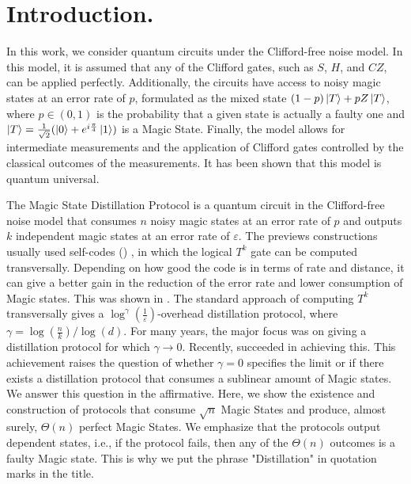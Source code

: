 \section{Introduction.}  
In this work, we consider quantum circuits under the Clifford-free noise model. In this model, it is assumed that any of the Clifford gates, such as $S$, $H$, and $CZ$, can be applied perfectly. Additionally, the circuits have access to noisy magic states at an error rate of $p$, formulated as the mixed state $(1-p)\ket{T} + pZ\ket{T}$, where $p \in (0,1)$ is the probability that a given state is actually a faulty one and $\ket{T}= \frac{1}{\sqrt{2}}(\ket{0} + e^{i\frac{\pi}{4}}\ket{1})$ is a Magic State. Finally, the model allows for intermediate measurements and the application of Clifford gates controlled by the classical outcomes of the measurements. It has been shown that this model is quantum universal.

The Magic State Distillation Protocol is a quantum circuit in the Clifford-free noise model that consumes $n$ noisy magic states at an error rate of $p$ and outputs $k$ independent magic states at an error rate of $\varepsilon$. The previews constructions usually used self-\trig codes () \cite{bravyi2012magic}, in which the logical $T^{k}$ gate can be computed transversally. Depending on how good the code is in terms of rate and distance, it can give a better gain in the reduction of the error rate and lower consumption of Magic states. This was shown in . The standard approach of computing $T^{k}$ transversally gives a $\log^{\gamma}(\frac{1}{\varepsilon})$-overhead distillation protocol, where $\gamma = \log(\frac{n}{k}) / \log(d)$. 
For many years, the major focus was on giving a distillation protocol for which $\gamma \rightarrow 0$. Recently, \cite{constantoverheadmagicstatedistillation} succeeded in achieving this. This achievement raises the question of whether $\gamma = 0$ specifies the limit or if there exists a distillation protocol that consumes a sublinear amount of Magic states. We answer this question in the affirmative. Here, we show the existence and construction of protocols that consume $\sqrt{n}$ Magic States and produce, almost surely, $\Theta(n)$ perfect Magic States. We emphasize that the protocols output dependent states, i.e., if the protocol fails, then any of the $\Theta(n)$ outcomes is a faulty Magic state. This is why we put the phrase "Distillation" in quotation marks in the title.


